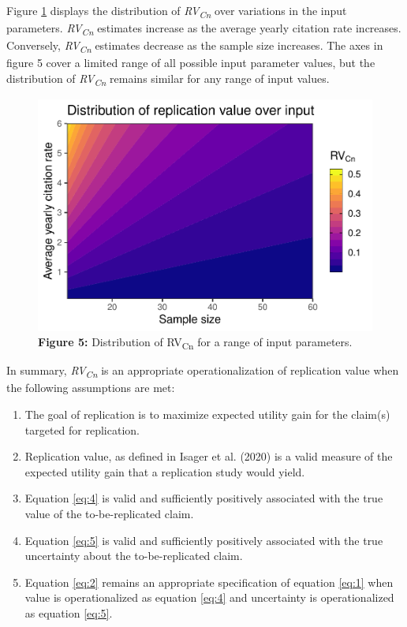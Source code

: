 \documentclass[
  english,
  man,floatsintext]{apa6}
\providecommand{\tightlist}{%
  \setlength{\itemsep}{0pt}\setlength{\parskip}{0pt}}
\begin{document}
Figure \ref{fig:5} displays the distribution of \emph{RV\textsubscript{Cn}} over variations in the input parameters. \emph{RV\textsubscript{Cn}} estimates increase as the average yearly citation rate increases. Conversely, \emph{RV\textsubscript{Cn}} estimates decrease as the sample size increases. The axes in figure 5 cover a limited range of all possible input parameter values, but the distribution of \emph{RV\textsubscript{Cn}} remains similar for any range of input values.

\begin{figure}
\centering
\includegraphics{RVcn_manuscript_files/figure-latex/5-1.pdf}
\caption{\label{fig:5}\textbf{Figure 5:} Distribution of RV\textsubscript{Cn} for a range of input parameters.}
\end{figure}

In summary, \emph{RV\textsubscript{Cn}} is an appropriate operationalization of replication value when the following assumptions are met:

\begin{enumerate}
\def\labelenumi{\arabic{enumi}.}
\tightlist
\item
  The goal of replication is to maximize expected utility gain for the claim(s) targeted for replication.
\item
  Replication value, as defined in Isager et al. (2020) is a valid measure of the expected utility gain that a replication study would yield.
\item
  Equation \eqref{eq:4} is valid and sufficiently positively associated with the true value of the to-be-replicated claim.
\item
  Equation \eqref{eq:5} is valid and sufficiently positively associated with the true uncertainty about the to-be-replicated claim.
\item
  Equation \eqref{eq:2} remains an appropriate specification of equation \eqref{eq:1} when value is operationalized as equation \eqref{eq:4} and uncertainty is operationalized as equation \eqref{eq:5}.
\end{enumerate}
\end{document}
